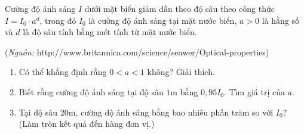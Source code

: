 \begin{vd}%
	Cường độ ánh sáng $I$ dưới mặt biển giảm dần theo độ sâu theo công thức $I=I_0\cdot a^d$, trong đó $I_0$ là cường độ ánh sáng tại mặt nước biển, $a>0$ là hằng số và $d$ là độ sâu tính bằng mét tính từ mặt nước biển.
	\begin{center}
		(\textit{Nguồn:}  http://www.britannica.com/science/seawer/Optical-properties)
	\end{center}
	\begin{enumerate}
		\item Có thể khẳng định rằng $0<a<1$ không? Giải thích.
		\item Biết rằng cường độ ánh sáng tại độ sâu $1$m bằng $0{,}95I_0$. Tìm giá trị của $a$.
		\item Tại độ sâu $20$m, cường độ ánh sáng bằng bao nhiêu phần trăm so với $I_0$? (Làm tròn kết quả đến hàng đơn vị.)
	\end{enumerate}
\end{vd}

